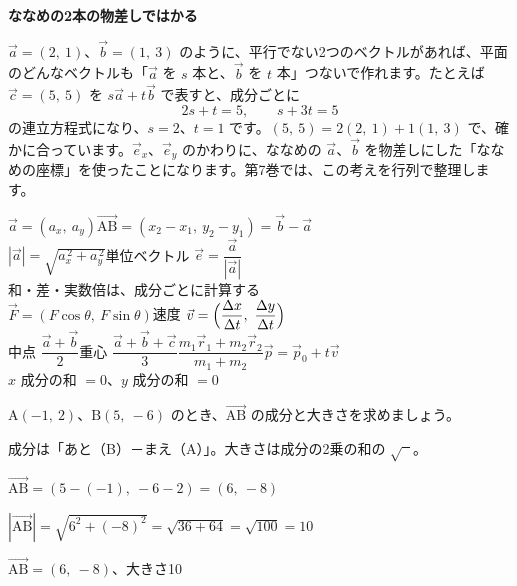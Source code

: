 \begin{motto}[3]
\textbf{ななめの2本の物差しではかる}\par
$\vec{a}=(2,\ 1)$、$\vec{b}=(1,\ 3)$ のように、平行でない2つのベクトルがあれば、平面のどんなベクトルも「$\vec{a}$ を $s$ 本と、$\vec{b}$ を $t$ 本」つないで作れます。たとえば $\vec{c}=(5,\ 5)$ を $s\vec{a}+t\vec{b}$ で表すと、成分ごとに
\[ 2s+t=5,\qquad s+3t=5 \]
の連立方程式になり、$s=2$、$t=1$ です。$(5,\ 5)=2(2,\ 1)+1(1,\ 3)$ で、確かに合っています。$\vec{e}_x$、$\vec{e}_y$ のかわりに、ななめの $\vec{a}$、$\vec{b}$ を物差しにした「ななめの座標」を使ったことになります。第7巻では、この考えを行列で整理します。
\end{motto}

\begin{taisetsu}
\def\tsl#1{\makebox[4.2\zw][l]{\sffamily\bfseries\small\color{bkDeep}#1}}
\tsl{成分}$\vec{a}=(a_x,\ a_y)$\qquad $\overrightarrow{\mathrm{AB}}=(x_2-x_1,\ y_2-y_1)=\vec{b}-\vec{a}$\\[3pt]
\tsl{大きさ}$|\vec{a}|=\sqrt{a_x^{\,2}+a_y^{\,2}}$\qquad 単位ベクトル $\vec{e}=\dfrac{\vec{a}}{|\vec{a}|}$\\[3pt]
\tsl{計算}和・差・実数倍は、成分ごとに計算する\\[3pt]
\tsl{分解}$\vec{F}=(F\cos\theta,\ F\sin\theta)$\qquad 速度 $\vec{v}=\Bigl(\dfrac{\Delta x}{\Delta t},\ \dfrac{\Delta y}{\Delta t}\Bigr)$\\[3pt]
\tsl{位置}中点 $\dfrac{\vec{a}+\vec{b}}{2}$\quad 重心 $\dfrac{\vec{a}+\vec{b}+\vec{c}}{3}$\quad $\dfrac{m_1\vec{r}_1+m_2\vec{r}_2}{m_1+m_2}$\quad $\vec{p}=\vec{p}_0+t\vec{v}$\\[3pt]
\tsl{つり合い}$x$ 成分の和 $=0$、$y$ 成分の和 $=0$
\end{taisetsu}

\begin{kotoba}
\small
{}
\end{kotoba}


\begin{reidai}[2点から成分と大きさを求める]
$\mathrm{A}(-1,\ 2)$、$\mathrm{B}(5,\ -6)$ のとき、$\overrightarrow{\mathrm{AB}}$ の成分と大きさを求めましょう。\par
\kangaekata 成分は「あと（B）－まえ（A）」。大きさは成分の2乗の和の $\sqrt{\phantom{x}}$。\par
\shiki $\overrightarrow{\mathrm{AB}}=(5-(-1),\ -6-2)=(6,\ -8)$\par
\hspace*{2.6\zw}$|\overrightarrow{\mathrm{AB}}|=\sqrt{6^2+(-8)^2}=\sqrt{36+64}=\sqrt{100}=10$\par
\kotae $\overrightarrow{\mathrm{AB}}=(6,\ -8)$、大きさ10
\end{reidai}

